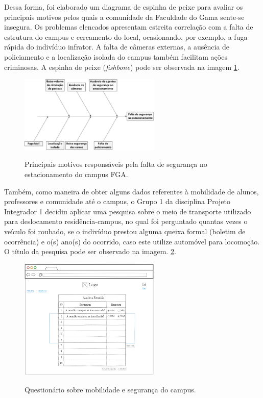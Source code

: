 Dessa forma, foi elaborado um diagrama de espinha de peixe para avaliar os principais motivos pelos quais a comunidade da Faculdade do Gama sente-se insegura. Os problemas elencados apresentam estreita correlação com a falta de estrutura do campus e cercamento do local, ocasionando, por exemplo, a fuga rápida do indivíduo infrator. A falta de câmeras externas, a ausência de policiamento e a localização isolada do campus também facilitam ações criminosas. A espinha de peixe (\textit{fishbone}) pode ser observada na imagem \ref{img:fishbone}.

\begin{figure}[htp]
	\centering
	\caption{Principais motivos responsáveis pela falta de segurança no estacionamento do campus FGA.}
	\includegraphics[width=0.6\textwidth]{figuras/fishbone}
	\label{img:fishbone}
\end{figure}

Também, como maneira de obter alguns dados referentes à mobilidade de alunos, professores e comunidade até o campus, o Grupo 1 da disciplina Projeto Integrador 1 decidiu aplicar uma pesquisa sobre o meio de transporte utilizado para deslocamento residência-campus, no qual foi perguntado quantas vezes o veículo foi roubado, se o indivíduo prestou alguma queixa formal (boletim de ocorrência) e o(s) ano(s) do ocorrido, caso este utilize automóvel para locomoção. O título da pesquisa pode ser observado na imagem. \ref{img:questionario}.

\begin{figure}[htp]
	\centering
	\caption{Questionário sobre mobilidade e segurança do campus.}
	\includegraphics[width=0.6\textwidth]{figuras/questionario}
	\label{img:questionario}
\end{figure}

